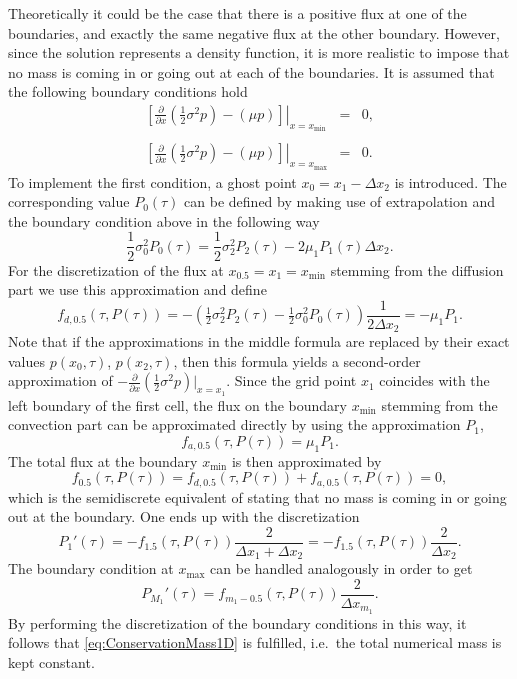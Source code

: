 \documentclass[10pt]{article}
\begin{document}
Theoretically it could be the case that there is a positive flux at one of the boundaries, and exactly the same negative flux at the other boundary. 
However, since the solution represents a density function, it is more realistic to impose that no mass is coming in or going out at each of the boundaries. It is assumed that the following boundary conditions hold
\begin{eqnarray*}
\left. \left[ \tfrac{\partial}{\partial x} \left( \tfrac{1}{2} \sigma^{2}p \right) - \left( \mu p \right) \right]\right\vert_{x=x_{\min}} &=& 0, \\\\
\left. \left[ \tfrac{\partial}{\partial x} \left( \tfrac{1}{2} \sigma^{2}p \right) - \left( \mu p \right) \right]\right\vert_{x=x_{\max}} &=& 0.
\end{eqnarray*}
To implement the first condition, a ghost point $x_{0}=x_{1}-\Delta x_{2}$ is introduced.
The corresponding value $P_{0}(\tau)$ can be defined by making use of extrapolation and the boundary condition above in the following way
\begin{equation}
\frac{1}{2} \sigma_{0}^{2} P_{0}(\tau) = \frac{1}{2} \sigma_{2}^{2} P_{2}(\tau) - 2 \mu_{1} P_{1}(\tau) \Delta x_{2}.
\label{eq:ExtrapolBoundary}
\end{equation}
For the discretization of the flux at $x_{0.5}=x_{1}=x_{\min}$ stemming from the diffusion part we use this approximation and define
$$ f_{d,0.5}(\tau,P(\tau)) = -\left(\tfrac{1}{2} \sigma^{2}_{2} P_{2}(\tau) - \tfrac{1}{2} \sigma^{2}_{0} P_{0}(\tau)\right) \frac{1}{2\Delta x_{2}} = -\mu_{1}P_{1}. $$
Note that if the approximations in the middle formula are replaced by their exact values $p(x_{0},\tau)$, $p(x_{2},\tau)$, then this formula yields a second-order approximation of $-\tfrac{\partial}{\partial x} \left( \tfrac{1}{2} \sigma^{2}p \right) \vert_{x=x_{1}}$.
Since the grid point $x_{1}$ coincides with the left boundary of the first cell, the flux on the boundary $x_{\min}$ stemming from the convection part can be approximated directly by using the approximation $P_{1}$,
$$ f_{a,0.5}(\tau,P(\tau)) = \mu_{1} P_{1}. $$
The total flux at the boundary $x_{\min}$ is then approximated by 
$$ f_{0.5}(\tau,P(\tau)) = f_{d,0.5}(\tau,P(\tau)) + f_{a,0.5}(\tau,P(\tau))=0, $$
which is the semidiscrete equivalent of stating that no mass is coming in or going out at the boundary.
One ends up with the discretization
$$ P_{1}'(\tau) = -f_{1.5}(\tau,P(\tau))\frac{2}{\Delta x_{1} + \Delta x_{2}} = -f_{1.5}(\tau,P(\tau))\frac{2}{\Delta x_{2}}. $$
The boundary condition at $x_{\max}$ can be handled analogously in order to get
$$ P_{M_{1}}'(\tau) = f_{m_{1}-0.5}(\tau,P(\tau)) \frac{2}{\Delta x_{m_{1}}}. $$ 
By performing the discretization of the boundary conditions in this way, it follows that \eqref{eq:ConservationMass1D} is fulfilled, i.e.\ the total numerical mass is kept constant. 
\end{document}
